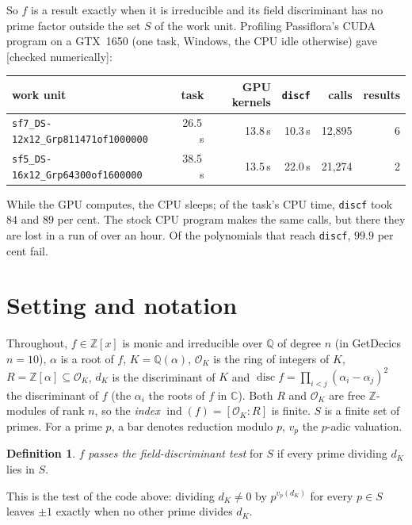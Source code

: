\documentclass[10pt,a4paper]{article}
\newcommand{\Z}{\mathbb{Z}}
\newcommand{\Q}{\mathbb{Q}}
\newcommand{\OK}{\mathcal{O}_K}
\DeclareMathOperator{\disc}{disc}
\DeclareMathOperator{\ind}{ind}
\newcommand{\code}[1]{\texttt{#1}}
\newcommand{\stnum}{\textsf{\small[checked numerically]}\xspace}
\theoremstyle{plain}
\theoremstyle{definition}
\newtheorem{definition}[proposition]{Definition}
\begin{document}
\noindent So $f$ is a result exactly when it is irreducible and its field discriminant has no prime factor outside the set $S$ of the
work unit.  Profiling Passiflora's CUDA program on a GTX~1650 (one task, Windows, the CPU idle otherwise) gave \stnum:

\begin{center}
\begin{tabular}{@{}lrrrrr@{}}
\toprule
work unit & task & GPU kernels & \code{discf} & calls & results \\
\midrule
\code{sf7\_DS-12x12\_Grp811471of1000000} & 26.5\,s & 13.8\,s & 10.3\,s & 12{,}895 & 6 \\
\code{sf5\_DS-16x12\_Grp64300of1600000}  & 38.5\,s & 13.5\,s & 22.0\,s & 21{,}274 & 2 \\
\bottomrule
\end{tabular}
\end{center}

\noindent While the GPU computes, the CPU sleeps; of the task's CPU time, \code{discf} took $84$ and $89$ per cent.  The stock CPU program
makes the same calls, but there they are lost in a run of over an hour.  Of the polynomials that reach \code{discf}, $99.9$ per cent
fail.

\section{Setting and notation}\label{sec:setting}

Throughout, $f\in\Z[x]$ is monic and irreducible over $\Q$ of degree $n$ (in GetDecics $n=10$), $\alpha$ is a root of $f$,
$K=\Q(\alpha)$, $\OK$ is the ring of integers of $K$, $R=\Z[\alpha]\subseteq\OK$, $d_K$ is the discriminant of $K$ and
$\disc f=\prod_{i<j}(\alpha_i-\alpha_j)^2$ the discriminant of $f$ (the $\alpha_i$ the roots of $f$ in $\mathbb C$).  Both $R$ and
$\OK$ are free $\Z$-modules of rank $n$, so the \emph{index} $\ind(f)=[\OK:R]$ is finite.  $S$ is a finite set of primes.  For a
prime $p$, a bar denotes reduction modulo $p$, $v_p$ the $p$-adic valuation.

\begin{definition}
$f$ \emph{passes the field-discriminant test} for $S$ if every prime dividing $d_K$ lies in $S$.
\end{definition}

\noindent This is the test of the code above: dividing $d_K\neq0$ by $p^{v_p(d_K)}$ for every $p\in S$ leaves $\pm1$ exactly when no
other prime divides $d_K$.
\end{document}
